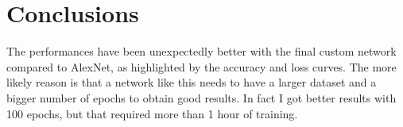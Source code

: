\documentclass[11pt]{article}
\begin{document}
	\section{Conclusions}
	The performances have been unexpectedly better with the final custom network compared
	to AlexNet, as highlighted by the accuracy and loss curves. The more likely reason
	is that a network like this needs to have a larger dataset and a bigger number
	of epochs to obtain good results. In fact I got better results with 100 epochs,
	but that required more than 1 hour of training.
\end{document}
